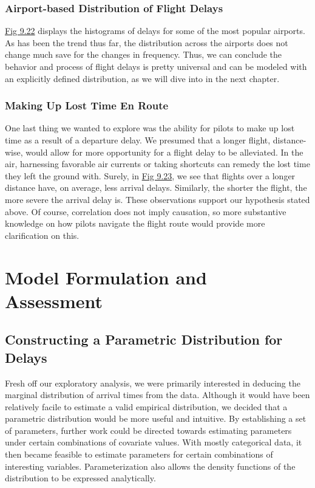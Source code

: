 \documentclass[12pt, a4paper, openany]{book}
\newcommand\tab[1][1cm]{\hspace*{#1}}
\begin{document}
		\subsection{Airport-based Distribution of Flight Delays}
			
			\tab \underline{Fig 9.22} displays the histograms of delays for some of the most popular airports. As has been the trend thus far, the distribution across the airports does not change much save for the changes in frequency. Thus, we can conclude the behavior and process of flight delays is pretty universal and can be modeled with an explicitly defined distribution, as we will dive into in the next chapter. \\
		\subsection{Making Up Lost Time En Route}
			\tab One last thing we wanted to explore was the ability for pilots to make up lost time as a result of a departure delay. We presumed that a longer flight, distance-wise, would allow for more opportunity for a flight delay to be alleviated. In the air, harnessing favorable air currents or taking shortcuts can remedy the lost time they left the ground with. Surely, in \underline{Fig 9.23}, we see that flights over a longer distance have, on average, less arrival delays. Similarly, the shorter the flight, the more severe the arrival delay is. These observations support our hypothesis stated above. Of course, correlation does not imply causation, so more substantive knowledge on how pilots navigate the flight route would provide more clarification on this. \\

\chapter{Model Formulation and Assessment}
	\section{Constructing a Parametric Distribution for \\Delays}
	 \tab Fresh off our exploratory analysis, we were primarily interested in deducing the marginal distribution of arrival times from the data. Although it would have been relatively facile to estimate a valid empirical distribution, we decided that a parametric distribution would be more useful and intuitive. By establishing a set of parameters, further work could be directed towards estimating parameters under certain combinations of covariate values. With mostly categorical data, it then became feasible to estimate parameters for certain combinations of interesting variables. Parameterization also allows the density functions of the distribution to be expressed analytically.\\
\end{document}
